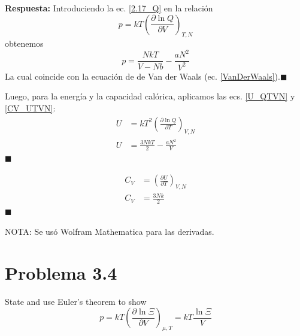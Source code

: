 \documentclass[]{article}
\numberwithin{equation}{section}
\newcommand{\0}{\textcolor{gray}{0}}
\newcommand{\deriv}[3]{\left(\frac{\partial #1}{\partial #2} \right)_{#3}}
\newcommand{\qed}{\hfill\(\blacksquare\)}
\begin{document}
\textbf{Respuesta:}
Introduciendo la ec. \ref{2.17_Q} en la relación
\begin{equation}
	p = k T \deriv{\ln Q}{V}{T,N}\label{p_QVTN}
\end{equation}
obtenemos
\begin{equation}
	p =\frac{N k T}{V - N b}-\frac{a N^2}{V^2}
\end{equation}
La cual coincide con la ecuación de de Van der Waals (ec. \ref{VanDerWaals}).\qed

Luego, para la energía y la capacidad calórica, aplicamos las ecs. \ref{U_QTVN} y \ref{CV_UTVN}:
\begin{align}
	U &= k T^2 \deriv{\ln Q}{T}{V,N}\nonumber\\
	U &= \frac{3 N k T}{2} - \frac{a N^2}{V}
\end{align}
\qed

\begin{align}
	C_V &= \deriv{U}{T}{V,N}\nonumber\\
	C_V &= \frac{3 N k}{2}	
\end{align}
\qed

NOTA: Se usó Wolfram Mathematica para las derivadas.

\section{Problema 3.4}
State and use Euler's theorem to show
\begin{equation}
	p=k T\left(\frac{\partial \ln \Xi}{\partial V}\right)_{\mu, T}=k T \frac{\ln \Xi}{V}
\end{equation}
\\
\end{document}
